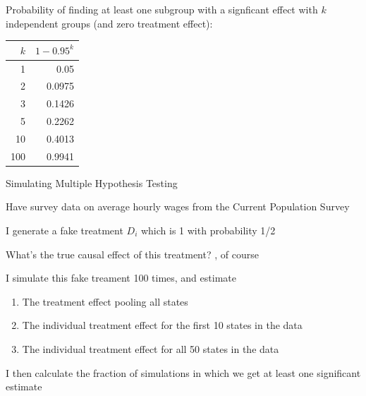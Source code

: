 \documentclass[11pt,english,handout]{beamer}
\newenvironment{wideitemize}{\itemize\addtolength{\itemsep}{10pt}}{\enditemize}
\begin{document}
\begin{frame}
Probability of finding at least one subgroup with a signficant effect with $k$ independent groups (and zero treatment effect):	\\
		\begin{tabular}{rr}
		$k$& $1-0.95^k$ \\ \hline 
		1 & 0.05 \\
		2 & 0.0975 \\ \pause{}
		3 & \pause{} 0.1426 \\
		5 &\pause{} 0.2262 \\
		10 & \pause{} 0.4013\\
		100 & \pause{} 0.9941
	\end{tabular}

\end{frame}


\begin{frame}{Simulating Multiple Hypothesis Testing}
\begin{wideitemize}
	\item
	Have survey data on average hourly wages from the Current Population Survey
	
	\item
	I generate a fake treatment $D_i$ which is 1 with probability 1/2
	
	\pause
	\item
	What's the true causal effect of this treatment? , of course
	
	\pause
	\item
	I simulate this fake treament 100 times, and estimate 
	
	\begin{enumerate}
		\item 
		The treatment effect pooling all states
		
		\item
		The individual treatment effect for the first 10 states in the data
		
		\item
		The individual treatment effect for all 50 states in the data
		
	\end{enumerate}

	\pause
	\item
	I then calculate the fraction of simulations in which we get at least one significant estimate

\end{wideitemize}	
	
\end{frame}
\end{document}
